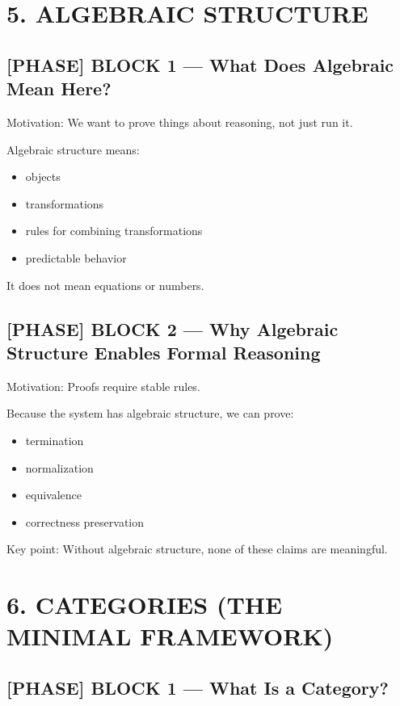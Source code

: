 \section*{5. ALGEBRAIC STRUCTURE}

\subsection*{[PHASE] BLOCK 1 --- What Does Algebraic Mean Here?}

Motivation: We want to prove things about reasoning, not just run it.\par

 Algebraic structure means:\n\n\begin{itemize}\n\item objects
\item transformations
\item rules for combining transformations
\item predictable behavior\n\end{itemize}

It does not mean equations or numbers.\par

\subsection*{[PHASE] BLOCK 2 --- Why Algebraic Structure Enables Formal Reasoning}

Motivation: Proofs require stable rules.\par

Because the system has algebraic structure, we can prove:\n\n\begin{itemize}\n\item termination
\item normalization
\item equivalence
\item correctness preservation\n\end{itemize}

Key point: Without algebraic structure, none of these claims are meaningful.\par

\section*{6. CATEGORIES (THE MINIMAL FRAMEWORK)}

\subsection*{[PHASE] BLOCK 1 --- What Is a Category?}

